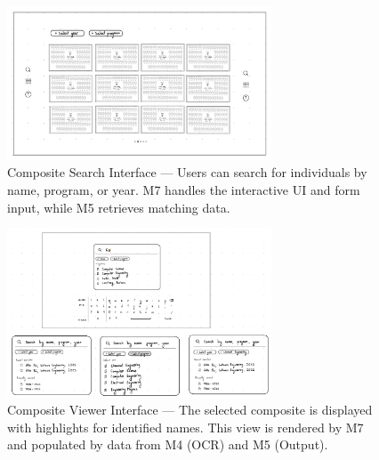 \documentclass[12pt, titlepage]{article}
\begin{document}
\begin{figure}[H]
\centering
\includegraphics[width=0.7\textwidth]{IMG_0070.png}
\caption{Composite Search Interface — Users can search for individuals by name, program, or year. M7 handles the interactive UI and form input, while M5 retrieves matching data.}
\label{FigUISearch}
\end{figure}

\begin{figure}[H]
\centering
\includegraphics[width=0.7\textwidth]{IMG_0071.png}
\caption{Composite Viewer Interface — The selected composite is displayed with highlights for identified names. This view is rendered by M7 and populated by data from M4 (OCR) and M5 (Output).}
\label{FigUIView}
\end{figure}
\end{document}
